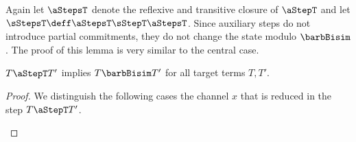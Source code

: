 \documentclass[]{eptcs}
\begin{document}
\noindent
Again let $ \aStepsT $ denote the reflexive and transitive closure of $ \aStepT $ and let $ \sStepsT \deff \aStepsT \sStepT \aStepsT $.
Since auxiliary steps do not introduce partial commitments, they do not change the state modulo $ \barbBisim $. The proof of this lemma is very similar to the central case.

\begin{lemma}
	$ T \aStepT T' $ implies $ T \barbBisim T' $ for all target terms $ T, T' $.
	\label{lem:auxStepsDecentral}
\end{lemma}

\begin{proof}
	We distinguish the following cases \wrt the channel $ x $ that is reduced in the step $ T \aStepT T' $.
	\begin{compactenum}


\end{compactenum}
\end{proof}
\end{document}
